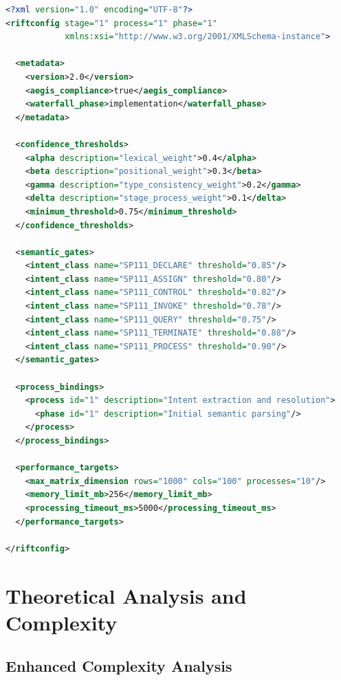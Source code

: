 \documentclass[11pt,a4paper]{article}
\theoremstyle{definition}
\theoremstyle{remark}
\begin{document}
\begin{lstlisting}[style=riftstyle, language=XML, caption={gov.riftrc.111.xml Structure}, label=lst:config-xml]
<?xml version="1.0" encoding="UTF-8"?>
<riftconfig stage="1" process="1" phase="1" 
            xmlns:xsi="http://www.w3.org/2001/XMLSchema-instance">
  
  <metadata>
    <version>2.0</version>
    <aegis_compliance>true</aegis_compliance>
    <waterfall_phase>implementation</waterfall_phase>
  </metadata>
  
  <confidence_thresholds>
    <alpha description="lexical_weight">0.4</alpha>
    <beta description="positional_weight">0.3</beta>
    <gamma description="type_consistency_weight">0.2</gamma>
    <delta description="stage_process_weight">0.1</delta>
    <minimum_threshold>0.75</minimum_threshold>
  </confidence_thresholds>
  
  <semantic_gates>
    <intent_class name="SP111_DECLARE" threshold="0.85"/>
    <intent_class name="SP111_ASSIGN" threshold="0.80"/>
    <intent_class name="SP111_CONTROL" threshold="0.82"/>
    <intent_class name="SP111_INVOKE" threshold="0.78"/>
    <intent_class name="SP111_QUERY" threshold="0.75"/>
    <intent_class name="SP111_TERMINATE" threshold="0.88"/>
    <intent_class name="SP111_PROCESS" threshold="0.90"/>
  </semantic_gates>
  
  <process_bindings>
    <process id="1" description="Intent extraction and resolution">
      <phase id="1" description="Initial semantic parsing"/>
    </process>
  </process_bindings>
  
  <performance_targets>
    <max_matrix_dimension rows="1000" cols="100" processes="10"/>
    <memory_limit_mb>256</memory_limit_mb>
    <processing_timeout_ms>5000</processing_timeout_ms>
  </performance_targets>
  
</riftconfig>
\end{lstlisting}


\section{Theoretical Analysis and Complexity}
\label{sec:theoretical-analysis}

\subsection{Enhanced Complexity Analysis}
\label{subsec:complexity-analysis}
\end{document}
